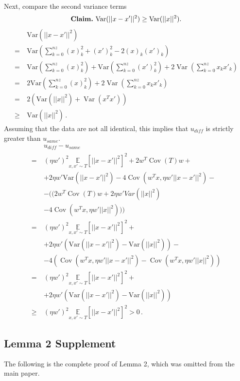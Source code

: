 \documentclass[runningheads]{llncs}
\DeclareMathOperator{\Var}{Var}
\DeclareMathOperator{\Cov}{Cov}
\begin{document}
Next, compare the second variance terms
\[
\textbf{Claim.} \ \text{Var}(||x - x'||^2) \geq \text{Var}(||x||^2). \\[10pt]
\]
\begin{align*}
    &\text{Var}(||x - x'||^2)  \\
    =& \text{Var}\left(\sum_{k=0}^{nz}(x)_k^2  + (x')_k^2 - 2(x)_k(x')_k\right) \\
    =\ & \text{Var}\left(\sum_{k=0}^{nz}(x)_k^2\right) + \text{Var}\left(\sum_{k=0}^{nz}(x')_k^2\right) + 2\Var \left(\sum_{k=0}^{nz} x_kx'_k\right) \\
    =\ & 2\text{Var}\left(\sum_{k=0}^{nz}(x)_k^2\right)  + 2\Var \left(\sum_{k=0}^{nz} x_kx'_k\right)\\
    =\ & 2(\text{Var}(||x||^2) + \Var(x^Tx'))\\
    \geq \ & \text{Var}(||x||^2) \,.
\end{align*}
Assuming that the data are not all identical, this implies that $u_{\mathit{diff}}$ is strictly greater than $u_{same}$.
\begin{align*}
    &u_{\mathit{diff}} - u_{same}  \\
    = \ &(\eta w')^2\underset{x, x' \sim T}{\mathbb{E}}[||x-x'||^2]^2 + 2w^T\Cov(T)w + \\ &+2\eta w'\text{Var}(||x - x'||^2) - 4\Cov(w^Tx, \eta w'||x - x'||^2) - \\
        &- ((2w^T\Cov(T)w + 2\eta w' Var(||x||^2) \\
     &   - 4\Cov(w^Tx, \eta w'||x||^2))) \\
    = \ & (\eta w')^2\underset{x, x' \sim T}{\mathbb{E}}[||x-x'||^2]^2 + \\
    \hspace{10pt}& + 2\eta w'\left(\text{Var}(||x - x'||^2) - \text{Var}(||x||^2)\right) - \\
    & - 4\left(\Cov(w^Tx, \eta w'||x - x'||^2) - \Cov(w^Tx, \eta w'||x||^2)\right) \\
    = \ & (\eta w')^2\underset{x, x' \sim T}{\mathbb{E}}[||x-x'||^2]^2 + \\
    \hspace{10pt}& + 2\eta w'\left(\text{Var}(||x - x'||^2) - \text{Var}(||x||^2)\right) \\
    \geq \ & (\eta w')^2\underset{x, x' \sim T}{\mathbb{E}}[||x-x'||^2]^2 > 0\,.
\end{align*}

\subsection{Lemma 2 Supplement}\vspace*{-1ex}
The following is the complete proof of Lemma 2, which was omitted from the main paper.
\end{document}
